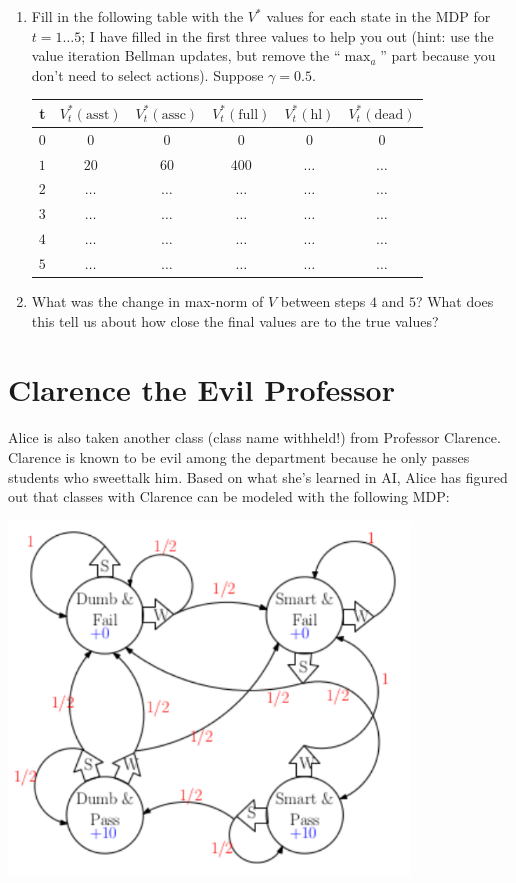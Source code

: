 \documentclass[fleqn]{hw}
\begin{document}
\begin{enumerate}

\item Fill in the following table with the $V^*$ values for each state in
the MDP for $t = 1 \dots 5$; I have filled in the first three values
to help you out (hint: use the value iteration Bellman updates, but
remove the ``$\max_a$'' part because you don't need to select
actions).  Suppose $\gamma = 0.5$.

\begin{tabular}{|c||c|c|c|c|c|}
\hline
{\bf t} & $V_t^*(\text{asst})$ & $V_t^*(\text{assc})$ & $V_t^*(\text{full})$ & $V_t^*(\text{hl})$ & $V_t^*(\text{dead})$ \\
\hline
$0$ & $0$ & $0$ & $0$ & $0$ & $0$ \\
\hline
$1$ & $20$ & $60$ & $400$ & $\dots$ & $\dots$ \\
\hline
$2$ & $\dots$ & $\dots$ & $\dots$ & $\dots$ & $\dots$ \\
\hline
$3$ & $\dots$ & $\dots$ & $\dots$ & $\dots$ & $\dots$ \\
\hline
$4$ & $\dots$ & $\dots$ & $\dots$ & $\dots$ & $\dots$ \\
\hline
$5$ & $\dots$ & $\dots$ & $\dots$ & $\dots$ & $\dots$ \\
\hline
\end{tabular}

\item What was the change in max-norm of $V$ between steps $4$ and $5$?  What does this tell us about how close the final values are to the true values?

\end{enumerate}

\newpage

\section{Clarence the Evil Professor}

Alice is also taken another class (class name withheld!) from
Professor Clarence.  Clarence is known to be evil among the department
because he only passes students who sweettalk him.  Based on what
she's learned in AI, Alice has figured out that classes with Clarence
can be modeled with the following MDP:

\includegraphics[width=0.8\textwidth]{mdp.pdf}
\end{document}
